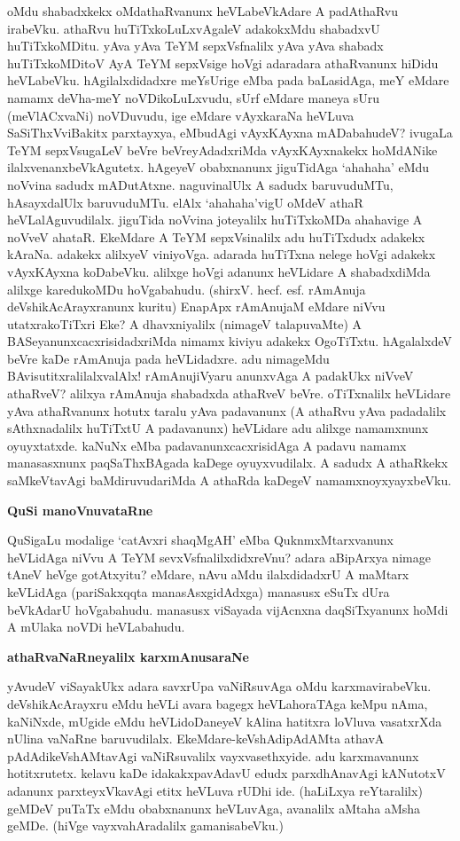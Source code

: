\noindent
oMdu shabadxkekx oMdathaRvanunx heVLabeVkAdare A padAthaRvu irabeVku. 
athaRvu huTiTxkoLuLx\-vAgaleV adakokxMdu shabadxvU huTiTxkoMDitu. yAva 
yAva TeYM sepxVsfnalilx yAva yAva shabadx huTiTx\-koMDitoV AyA TeYM 
sepxVsige hoVgi adaradara athaRvanunx hiDidu heVLabeVku. 
hAgilalxdidadxre meYsU\-rige eMba pada baLasidAga, meY eMdare namamx 
deVha-meY noVDikoLuLxvudu, sUrf eMdare maneya sUru (meVlACxvaNi) 
noVDuvudu, ige eMdare vAyxkaraNa heVLuva SaSiThxVviBakitx parxtayxya, 
eMbudAgi vAyxKAyxna mADabahudeV? ivugaLa TeYM sepxVsugaLeV beVre beVreyAdadxriMda vAyxKAyxnakekx hoMdANike  ilalxvenanx\-beVkA\-gutetx. hAgeyeV obabxnanunx jiguTidAga `ahahaha' eMdu noVvina sadudx mADutAtxne. naguvi\-nalUlx A sadudx baruvuduMTu, hAsayxdalUlx baruvuduMTu. elAlx `ahahaha'vigU oMdeV athaR heVLa\-lAgu\-vudilalx. jiguTida noVvina joteyalilx huTiTxkoMDa ahahavige A noVveV ahataR. EkeMdare A TeYM sepxVsinalilx adu huTiTxdudx adakekx kAraNa. adakekx alilxyeV viniyoVga. adarada huTiTxna nelege hoVgi adakekx vAyxKAyxna koDabeVku. alilxge hoVgi adanunx heVLidare A shabadxdiMda alilxge karedukoMDu hoVga\-bahudu.  (shirxV. hecf. esf. rAmAnuja deVshikAcArayxranunx kuritu) EnapApx rAmAnujaM \-eMdare niVvu utatxrakoTiTxri Eke? A dhavxniyalilx (nimageV talapuvaMte) A BASeyanunxcacxrisidadxriMda nimamx kiviyu adakekx OgoTiTxtu. hAgalalxdeV beVre kaDe rAmAnuja pada heVLidadxre. adu nimageMdu BAvisu\-titxra\-lilalx\-valAlx! rAmAnujiVyaru anunxvAga A padakUkx niVveV athaRveV? alilxya rAmAnuja shabadxda athaRveV beVre. oTiTxnalilx heVLidare yAva athaRvanunx hotutx taralu yAva padavanunx (A athaRvu yAva padadalilx sAthxnadalilx huTiTxtU A padavanunx) heVLidare adu alilxge namamxnunx oyuyxtatxde.  kaNuNx eMba padavanunxcacxrisidAga A padavu namamx manasasxnunx paqSaThxBAgada kaDege oyuyxvudilalx. A sadudx A athaRkekx saMkeVtavAgi baMdiruvudariMda A athaRda kaDegeV namamxnoyxyayxbeVku.

{\bigskip
\noindent
{\large\bf QuSi manoVnuvataRne}}\label{page114}
\medskip

\noindent
QuSigaLu modalige `catAvxri shaqMgAH' eMba QuknmxMtarxvanunx heVLidAga niVvu A TeYM sevxVsfnalilxdidx\-reVnu? adara aBipArxya nimage tAneV heVge gotAtxyitu? eMdare, nAvu aMdu ilalxdidadxrU A maMtarx keVLidAga (pariSakxqqta manasAsxgidAdxga) manasusx eSuTx dUra beVkAdarU hoVgabahudu. manasusx viSa\-yada vijAcnxna daqSiTxyanunx hoMdi A mUlaka noVDi heVLabahudu.

{\bigskip
\noindent
{\large\bf athaRvaNaRneyalilx karxmAnusaraNe}}\label{page144}
\medskip

\noindent
yAvudeV viSayakUkx adara savxrUpa vaNiRsuvAga oMdu karxmavirabeVku. 
deVshikAcArayxru eMdu heVLi avara bagegx heVLahoraTAga keMpu nAma, 
kaNiNxde, mUgide eMdu heVLidoDaneyeV kAlina hatitxra loVluva vasatxrXda nUlina vaNaRne baruvudilalx. EkeMdare-keVshAdipAdAMta athavA pAdAdikeVshAMta\-vAgi vaNiRsuvalilx vayxvasethxyide. adu karxmavanunx hotitxrutetx. kelavu kaDe idakakxpavAdavU edudx parxdhAna\-vAgi kANutotxV adanunx parxteyxVkavAgi etitx heVLuva rUDhi ide. (haLiLxya reYtaralilx) geMDeV puTaTx eMdu obabxnanunx heVLuvAga, avanalilx aMtaha aMsha geMDe. (hiVge vayxvahAradalilx gamanisabeVku.)

